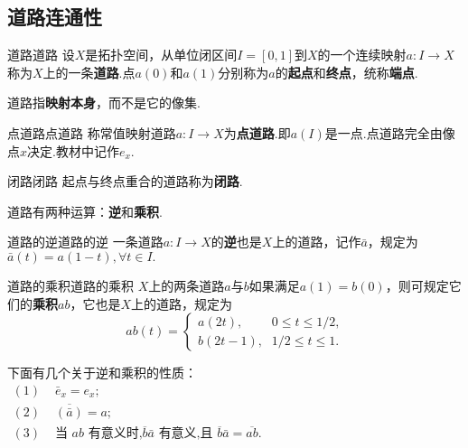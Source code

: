 \documentclass{ctexart}
\begin{document}
\subsection{道路连通性}
\begin{定义}{道路}{道路}
	设$X$是拓扑空间，从单位闭区间$I = [0,1]$到$X$的一个连续映射$a: I\to X$称为$X$上的一条\textbf{道路}.点$a(0)$和$a(1)$分别称为$a$的\textbf{起点}和\textbf{终点}，统称\textbf{端点}.
\end{定义}
\begin{注意}
	道路指\textbf{映射本身}，而不是它的像集.
\end{注意}
\begin{定义}{点道路}{点道路}
	称常值映射道路$a: I \to X$为\textbf{点道路}.即$a(I)$是一点.点道路完全由像点$x$决定.教材中记作$e_x.$
\end{定义}
\begin{定义}{闭路}{闭路}
	起点与终点重合的道路称为\textbf{闭路}.
\end{定义}
道路有两种运算：\textbf{逆}和\textbf{乘积}.
\begin{定义}{道路的逆}{道路的逆}
	一条道路$a:I\to X$的\textbf{逆}也是$X$上的道路，记作$\bar{a}$，规定为$ \bar{a}(t){=}a(1{-}t){,}\forall t{\in}I.$
\end{定义}
\begin{定义}{道路的乘积}{道路的乘积}
	$X$上的两条道路$a$与$b$如果满足$a(1)=b(0)$，则可规定它们的\textbf{乘积}$ab$，它也是$X$上的道路，规定为
	$$
	ab(t)=\begin{cases}a(2t),&0\leqslant t\leqslant1/2\text{,}\\b(2t-1)\text{,}&1/2\leqslant t\leqslant1.\end{cases}
	$$
\end{定义}
\begin{结论}{}{}
	下面有几个关于逆和乘积的性质：\\
$\begin{aligned}(1)&\,\,\bar{e}_x=e_x;\\(2)&\,\,\overline{(\bar{a})}=a;\\(3)&\text{ 当 }ab\text{ 有意义时,}\overline{b}\bar{a}\text{ 有意义,且 }\overline{b}\bar{a}=\overline{ab}.\end{aligned}$
\end{结论}
\end{document}
